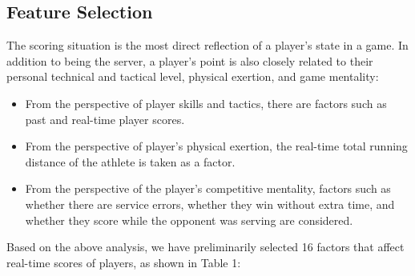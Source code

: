 \documentclass{mcmthesis}
\begin{document}
\subsection{Feature Selection}
The scoring situation is the most direct reflection of a player's state in a game. In addition to being the server, a player's point is also closely related to their personal technical and tactical level, physical exertion, and game mentality:
\begin{itemize}
  \item From the perspective of player skills and tactics, there are factors such as past and real-time player scores.
  \item From the perspective of player's physical exertion, the real-time total running distance of the athlete is taken as a factor.
  \item From the perspective of the player's competitive mentality, factors such as whether there are service errors, whether they win without extra time, and whether they score while the opponent was serving are considered.
\end{itemize}
Based on the above analysis, we have preliminarily selected 16 factors that affect real-time scores of players, as shown in Table 1:
\end{document}
